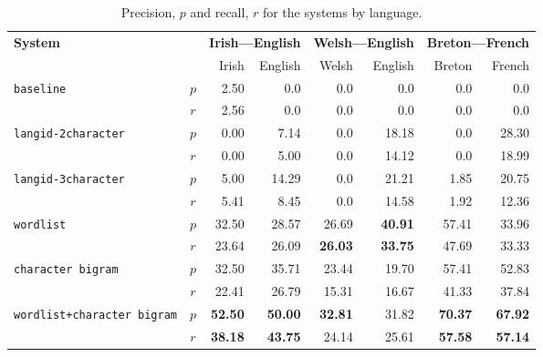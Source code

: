 \documentclass[11pt]{article}
\begin{document}
\begin{table}
\begin{center}
\begin{tabular}{|lc|r|r|r|r|r|r|}
\hline
\multirow{2}{*}{\textbf{System}}            & & \multicolumn{2}{c}{\textbf{Irish---English}} & \multicolumn{2}{|c|}{\textbf{Welsh---English}} & \multicolumn{2}{c|}{\textbf{Breton---French}}  \\\cline{3-8}
                                          &      &  Irish &  English & Welsh  & English & Breton & French \\
\hline 
\multirow{2}{*}{\texttt{baseline}}        &  $p$ &  2.50   & 0.0      & 0.0   & 0.0 & 0.0 & 0.0 \\
                                          & $r$  & 2.56    & 0.0      & 0.0   & 0.0 & 0.0 & 0.0 \\
\hline
\multirow{2}{*}{\texttt{langid-2character}}         &  $p$ &  0.00   & 7.14     & 0.0   & 18.18    & 0.0 & 28.30 \\
                                          & $r$  & 0.00    & 5.00     & 0.0   & 14.12 & 0.0 & 18.99 \\
\hline
\multirow{2}{*}{\texttt{langid-3character}}         &  $p$ &  5.00   & 14.29    & 0.0   & 21.21 & 1.85 & 20.75 \\
                                          & $r$  & 5.41    & 8.45     & 0.0   & 14.58 & 1.92 & 12.36 \\
\hline
\multirow{2}{*}{\texttt{wordlist}}        &  $p$ &  32.50 & 28.57     & 26.69 & {\bf 40.91} & 57.41 & 33.96 \\
                                          & $r$  & 23.64  & 26.09     & {\bf 26.03} & {\bf 33.75} & 47.69 & 33.33 \\
\hline
\multirow{2}{*}{\texttt{character bigram}}          &  $p$ &  32.50   & 35.71   & 23.44 & 19.70  & 57.41 & 52.83 \\
                                          & $r$  & 22.41    & 26.79   & 15.31 & 16.67 & 41.33 & 37.84 \\
\hline
\multirow{2}{*}{\texttt{wordlist+character bigram}} &  $p$ &  {\bf 52.50}   & {\bf 50.00}   & {\bf 32.81} & 31.82 & {\bf 70.37} & {\bf 67.92} \\
                                          & $r$  & {\bf 38.18}    & {\bf 43.75}   & 24.14 & 25.61 & {\bf 57.58} & {\bf 57.14} \\
\hline
\end{tabular}
\end{center}
\caption{Precision, $p$ and recall, $r$ for the systems by language.}
\label{table:precisionrecall}

\end{table}
\end{document}
